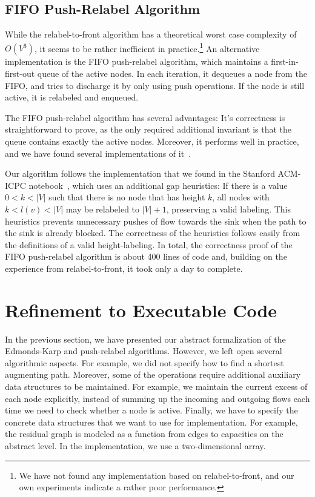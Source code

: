 \documentclass[smallcondensed]{svjour3}     %
\begin{document}
\subsection{FIFO Push-Relabel Algorithm}
While the relabel-to-front algorithm has a theoretical worst case complexity of $O(V^3)$, it seems to be rather inefficient in practice.\footnote{We have not found any implementation based on relabel-to-front, and our own experiments indicate a rather poor performance.}
An alternative implementation is the FIFO push-relabel algorithm, which maintains a first-in-first-out queue of the active nodes. 
In each iteration, it dequeues a node from the FIFO, and tries to discharge it by only using push operations.
If the node is still active, it is relabeled and enqueued.


The FIFO push-relabel algorithm has several advantages: It's correctness is straightforward to prove, 
as the only required additional invariant is that the queue contains exactly the active nodes. 
Moreover, it performs well in practice, and we have found several implementations of it~\cite{ChGo97,ICPC-notebook}.

Our algorithm follows the implementation that we found in the Stanford ACM-ICPC notebook~\cite{ICPC-notebook}, 
which uses an additional gap heuristics: If there is a value $0<k<|V|$ such that there is no node that has height $k$, 
all nodes with $k<l(v)<|V|$ may be relabeled to $|V|+1$, preserving a valid labeling. 
This heuristics prevents unnecessary pushes of flow towards the sink when the path to the sink is already blocked.
The correctness of the heuristics follows easily from the definitions of a valid height-labeling.
In total, the correctness proof of the FIFO push-relabel algorithm is about 400 lines of code and, building on the experience from relabel-to-front, it 
took only a day to complete.

  
    
\section{Refinement to Executable Code}\label{sec:executable}
  In the previous section, we have presented our abstract formalization of the Edmonds-Karp and push-relabel algorithms.
  However, we left open several algorithmic aspects. For example, we did not specify how to find a shortest augmenting path.
  Moreover, some of the operations require additional auxiliary data structures to be maintained. For example, 
  we maintain the current excess of each node explicitly, instead of summing up the incoming and outgoing flows each time 
  we need to check whether a node is active.
  Finally, we have to specify the concrete data structures that we want to use for implementation. 
  For example, the residual graph is modeled as a function from edges to capacities on the abstract level. In the implementation, we use a two-dimensional array.
  
\end{document}

